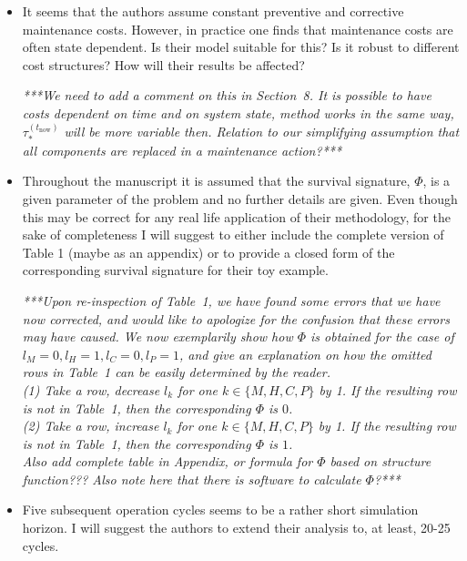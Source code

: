 \documentclass[authoryear]{elsarticle}
\def\tnow{t_\text{now}}
\newcommand{\tausnow}{\tau_*^{(\tnow)}}
\begin{document}
\begin{itemize}
\item It seems that the authors assume constant preventive and corrective maintenance costs. However, in practice one finds that maintenance costs are often state dependent. Is their model suitable for this? Is it robust to different cost structures? How will their results be affected?

\smallskip

\emph{***We need to add a comment on this in Section~8. It is possible to have costs dependent on time and on system state,
method works in the same way, $\tausnow$ will be more variable then.
Relation to our simplifying assumption that all components are replaced in a maintenance action?***}

\item Throughout the manuscript it is assumed that the survival signature, $\Phi$, is a given parameter of the problem and no further details are given. Even though this may be correct for any real life application of their methodology, for the sake of completeness I will suggest to either include the complete version of Table 1 (maybe as an appendix) or to provide a closed form of the corresponding survival signature for their toy example.

\smallskip

\emph{***Upon re-inspection of Table~1, we have found some errors that we have now corrected,
and would like to apologize for the confusion that these errors may have caused.
We now exemplarily show how $\Phi$ is obtained for the case of $l_M = 0, l_H = 1, l_C = 0, l_P = 1$,
and give an explanation on how the omitted rows in Table~1 can be easily determined by the reader.\\
{\scriptsize
(1) Take a row, decrease $l_k$ for one $k \in \{M, H, C, P\}$ by 1.
If the resulting row is not in Table~1, then the corresponding $\Phi$ is $0$.\\
(2) Take a row, increase $l_k$ for one $k \in \{M, H, C, P\}$ by 1.
If the resulting row is not in Table~1, then the corresponding $\Phi$ is $1$.}\\
Also add complete table in Appendix, or formula for $\Phi$ based on structure function???
Also note here that there is software to calculate $\Phi$?***}

\item Five subsequent operation cycles seems to be a rather short simulation horizon. I will suggest the authors to extend their analysis to, at least, 20-25 cycles.

\smallskip


\end{itemize}
\end{document}
